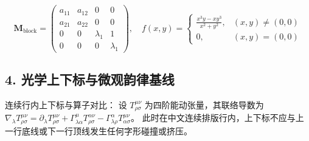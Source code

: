 \begin{equation}
  \mathbf{M}_{\text{block}} = \left(
    \begin{array}{cc|cc}
      a_{11} & a_{12} & 0 & 0 \\
      a_{21} & a_{22} & 0 & 0 \\
      \hline
      0 & 0 & \lambda_1 & 1 \\
      0 & 0 & 0 & \lambda_1
    \end{array}
  \right), \quad
  f(x, y) = \begin{cases}
    \frac{x^3 y - x y^3}{x^2 + y^2}, & (x, y) \ne (0, 0) \\
    0, & (x, y) = (0, 0)
  \end{cases}
\end{equation}

\subsection*{4. 光学上下标与微观韵律基线}

连续行内上下标与算子对比：
设 $T^{\mu\nu}_{\rho\sigma}$ 为四阶能动张量，其联络导数为 $\nabla_\lambda T^{\mu\nu}_{\rho\sigma} = \partial_\lambda T^{\mu\nu}_{\rho\sigma} + \Gamma^\mu_{\lambda\alpha} T^{\alpha\nu}_{\rho\sigma} - \Gamma^\alpha_{\lambda\rho} T^{\mu\nu}_{\alpha\sigma}$。
此时在中文连续排版行内，上下标不应与上一行底线或下一行顶线发生任何字形碰撞或挤压。
